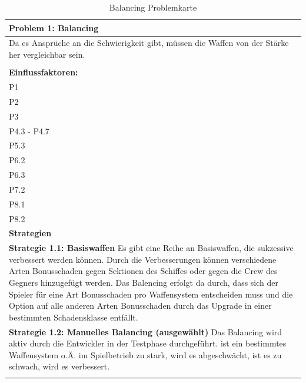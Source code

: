 \documentclass[fontsize=12pt,paper=a4,twoside]{scrartcl}
\begin{document}
\begin{table}[H]
    \centering
    \begin{tabular}{|p{15cm}|}
    \hline
          \textbf{Problem 1: Balancing}  \\ \hline
	Da es Ansprüche an die Schwierigkeit gibt, müssen die Waffen von der Stärke her vergleichbar sein. \\
         \\ \hline
          \textbf{Einflussfaktoren: } \\
	P1 \\
	P2 \\
	P3 \\
	P4.3 - P4.7 \\
	P5.3 \\
	P6.2 \\
	P6.3 \\
	P7.2 \\
	P8.1 \\
	P8.2 \\
          \hline
          \textbf{Strategien} \\ \hline
            {}          
           \label{strategie:1.1}     
          \textbf{Strategie 1.1: Basiswaffen} Es gibt eine Reihe an Basiswaffen, die sukzessive verbessert werden können. Durch die Verbesserungen können verschiedene Arten Bonusschaden gegen Sektionen des Schiffes oder gegen die Crew des Gegners hinzugefügt werden. Das Balencing erfolgt da durch, dass sich der Spieler für eine Art Bonusschaden pro Waffensystem entscheiden muss und die Option auf alle anderen Arten Bonusschaden durch das Upgrade in einer bestimmten Schadensklasse entfällt. \\        
  {}          
           \label{strategie:1.2}              
          \textbf{Strategie 1.2: Manuelles Balancing (ausgewählt)} Das Balancing wird aktiv durch die Entwickler in der Testphase durchgeführt. ist ein bestimmtes Waffensystem o.Ä. im Spielbetrieb zu stark, wird es abgeschwächt, ist es zu schwach, wird es verbessert.  \\
	 \\ \hline
    \end{tabular}

    \caption{Balancing Problemkarte}
    \label{tab:ProblemKarte1}
\end{table}
\end{document}
